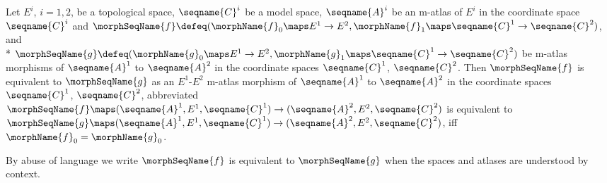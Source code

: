 \documentclass{article}
\begin{document}
\begin{definition}
Let $E^i$, $i=1,2$, be a topological space, $\seqname{C}^i$ be a model
space, $\seqname{A}^i$ be an m-atlas of $E^i$ in the coordinate space
$\seqname{C}^i$ and
$
  \morphSeqName{f} \defeq
  (
    \morphName{f}_0 \maps E^1 \to E^2,
    \morphName{f}_1 \maps \seqname{C}^1 \to \seqname{C}^2
  )
$, and \\*
$
  \morphSeqName{g} \defeq
  (
    \morphName{g}_0 \maps E^1 \to E^2,
    \morphName{g}_1 \maps \seqname{C}^1 \to \seqname{C}^2
  )
$
be m-atlas morphisms of $\seqname{A}^1$ to $\seqname{A}^2$ in the
coordinate spaces $\seqname{C}^1$, $\seqname{C}^2$.
Then $\morphSeqName{f}$ is equivalent to $\morphSeqName{g}$ as an
$E^1$-$E^2$ m-atlas morphism of $\seqname{A}^1$ to
$\seqname{A}^2$ in the coordinate spaces $\seqname{C}^1$,
$\seqname{C}^2$, abbreviated
$
  \morphSeqName{f} \maps
  (\seqname{A}^1, E^1, \seqname{C}^1) \to
  (\seqname{A}^2, E^2, \seqname{C}^2)
$
is equivalent to
$
  \morphSeqName{g} \maps
  (\seqname{A}^1, E^1, \seqname{C}^1) \to
  (\seqname{A}^2, E^2, \seqname{C}^2)
$,
iff $\morphName{f}_0 = \morphName{g}_0$.

By abuse of language we write $\morphSeqName{f}$ is equivalent to
$\morphSeqName{g}$ when the spaces and atlases are understood by context.
\end{definition}
\end{document}
